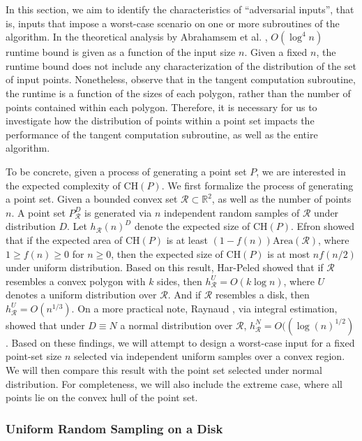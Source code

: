 \documentclass{article}
\newcommand{\CH}{\mathrm{CH}}
\begin{document}
In this section, we aim to identify the characteristics of ``adversarial inputs'', that is, inputs that impose a worst-case scenario on one or more subroutines of the algorithm. In the theoretical analysis by Abrahamsem et al. \cite{abb17}, $O(\log^4 n)$ runtime bound is given as a function of the input size $n$. Given a fixed $n$, the runtime bound does not include any characterization of the distribution of the set of input points. Nonetheless, observe that in the tangent computation subroutine, the runtime is a function of the sizes of each polygon, rather than the number of points contained within each polygon. Therefore, it is necessary for us to investigate how the distribution of points within a point set impacts the performance of the tangent computation subroutine, as well as the entire algorithm.

To be concrete, given a process of generating a point set $P$, we are interested in the expected complexity of $\CH(P)$. We first formalize the process of generating a point set. Given a bounded convex set $\mathcal{R} \subset \mathbb{R}^2$, as well as the number of points $n$. A point set $P_\mathcal{R}^D$ is generated via $n$ independent random samples of $\mathcal{R}$ under distribution $D$. Let $h_\mathcal{R}(n)^D$ denote the expected size of $\CH(P)$. Efron \cite{efr65} showed that if the expected area of $\CH(P)$ is at least $(1-f(n)) \mathrm{Area}(\mathcal{R})$, where $1 \geq f(n) \geq 0$ for $n \geq 0$, then the expected size of $\CH(P)$ is at most $nf(n/2)$ under uniform distribution. Based on this result, Har-Peled \cite{hp11} showed that if $\mathcal{R}$ resembles a convex polygon with $k$ sides, then $h_\mathcal{R}^U = O(k \log n)$, where $U$ denotes a uniform distribution over $\mathcal{R}$. And if $\mathcal{R}$ resembles a disk, then $h_\mathcal{R}^U = O(n^{1/3})$. On a more practical note, Raynaud \cite{ray70}, via integral estimation, showed that under $D \equiv N$ a normal distribution over $\mathcal{R}$, $h_\mathcal{R}^N = O((\log(n)^{1/2})$. Based on these findings, we will attempt to design a worst-case input for a fixed point-set size $n$ selected via independent uniform samples over a convex region. We will then compare this result with the point set selected under normal distribution. For completeness, we will also include the extreme case, where all points lie on the convex hull of the point set.

\subsubsection{Uniform Random Sampling on a Disk}
\end{document}
